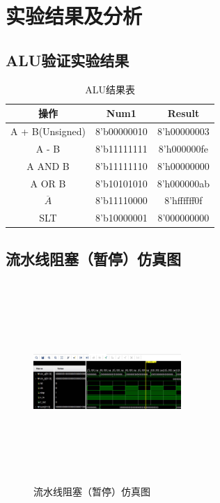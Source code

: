 \section{实验结果及分析}
\subsection{ALU验证实验结果}
\begin{table}[htbp]
    \caption{ALU结果表}\label{table0}
    \centering
    \begin{tabular}{c|c|c}
        操作            &	Num1        &	Result\\
        \hline
        A + B(Unsigned) &	8’b00000010 & 8’h00000003	\\
        A - B           &	8’b11111111 & 8’h000000fe   \\
        A AND B         &	8’b11111110 & 8’h00000000	\\
        A OR B          &	8’b10101010 & 8’h000000ab   \\
        $\overline{A}$  &	8’b11110000 & 8’hffffff0f   \\
        SLT             &	8’b10000001 & 8’000000000   \\
        \hline
    \end{tabular}
\end{table}
\subsection{流水线阻塞（暂停）仿真图}
\begin{figure}[htbp]
    \centering
    \includegraphics[width=0.5\textwidth,height=3in,keepaspectratio]{stop.jpg}
    \caption{流水线阻塞（暂停）仿真图}
    \label{image1}
\end{figure}
